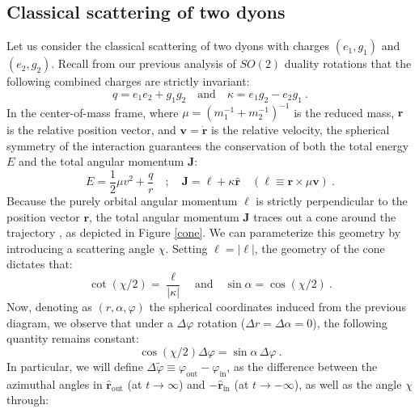 \documentclass[a4paper,11pt]{article}
\begin{document}
\subsection{Classical scattering of two dyons}
Let us consider the classical scattering of two dyons with charges $(e_1, g_1)$ and $(e_2, g_2)$. Recall from our previous analysis of $SO(2)$ duality rotations that the following combined charges are strictly invariant:
\begin{equation}
    q = e_1 e_2 + g_1 g_2 \quad \text{and} \quad \kappa = e_1 g_2 - e_2 g_1\ .
\end{equation}
In the center-of-mass frame, where $\mu = (m_1^{-1} + m_2^{-1})^{-1}$ is the reduced mass, $\boldsymbol{r}$ is the relative position vector, and $\boldsymbol{v} = \dot{\boldsymbol{r}}$ is the relative velocity, the spherical symmetry of the interaction guarantees the conservation of both the total energy $E$ and the total angular momentum $\boldsymbol{J}$:
\begin{equation}
    E = \frac{1}{2}\mu v^2 + \frac{q}{r} \quad ; \quad \boldsymbol{J} = \boldsymbol{\ell} + \kappa\hat{\boldsymbol r} \quad (\boldsymbol{\ell} \equiv \boldsymbol{r} \times \mu\boldsymbol{v})\ .
\end{equation}
Because the purely orbital angular momentum $\boldsymbol{\ell}$ is strictly perpendicular to the position vector $\boldsymbol{r}$, the total angular momentum $\boldsymbol{J}$ traces out a cone around the trajectory \cite{Birkeland1896, Poincare1896}, as depicted in Figure \ref{cone}. We can parameterize this geometry by introducing a scattering angle $\chi$. Setting $\ell = |\boldsymbol{\ell}|$, the geometry of the cone dictates that:
\begin{equation}
    \cot(\chi/2) = \frac{\ell}{|\kappa|} \quad \text{and} \quad \sin\alpha = \cos(\chi/2)\ .
\end{equation}
Now, denoting as $(r, \alpha, \varphi)$ the spherical coordinates induced from the previous diagram, we observe that under a $\Delta\varphi$ rotation ($\Delta r = \Delta\alpha = 0$), the following quantity remains constant:
\begin{equation}
    \cos(\chi/2)\Delta\varphi = \sin\alpha\,\Delta\varphi\ . 
\end{equation}
In particular, we will define $\Delta\tilde{\varphi} \equiv \varphi_{\text{out}} - \varphi_{\text{in}}$, as the difference between the azimuthal angles in $\hat{\boldsymbol r}_{\text{out}}$ (at $t \to \infty$) and $-\hat{\boldsymbol r}_{\text{in}}$ (at $t \to -\infty$), as well as the angle $\chi$ through:
\end{document}
